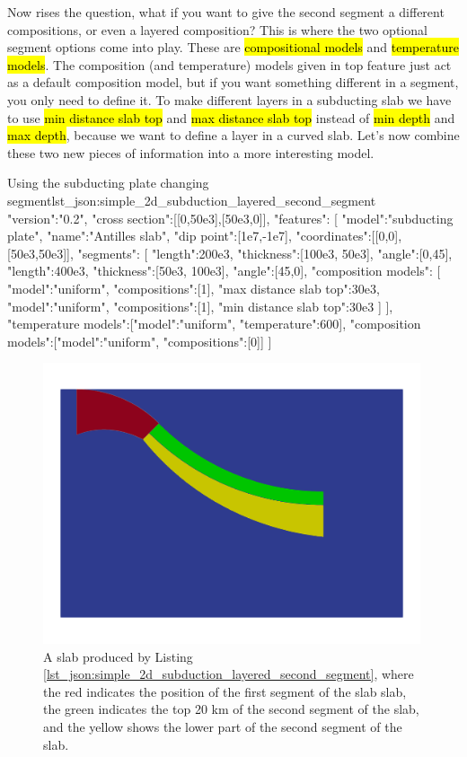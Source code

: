 \documentclass{book}
\begin{document}
Now rises the question, what if you want to give the second segment a different compositions, or even a layered composition? This is where the two optional segment options come into play. These are \hl{compositional models} and \hl{temperature models}. The composition (and temperature) models given in top feature just act as a default composition model, but if you want something different in a segment, you only need to define it. To make different layers in a subducting slab we have to use \hl{min distance slab top} and \hl{max distance slab top} instead of \hl{min depth} and \hl{max depth}, because we want to define a layer in a curved slab. Let's now combine these two new pieces of information into a more interesting model.

\begin{javascriptcode}{Using the subducting plate changing segment}{lst_json:simple_2d_subduction_layered_second_segment}
{
  "version":"0.2",
  "cross section":[[0,50e3],[50e3,0]],
  "features":
  [
     {
       "model":"subducting plate", "name":"Antilles slab", "dip point":[1e7,-1e7],
       "coordinates":[[0,0],[50e3,50e3]], 
       "segments":
       [
         {"length":200e3, "thickness":[100e3, 50e3], "angle":[0,45]},
         {
           "length":400e3, "thickness":[50e3, 100e3], "angle":[45,0],
           "composition models":
           [
             {"model":"uniform", "compositions":[1], "max distance slab top":30e3},
             {"model":"uniform", "compositions":[1], "min distance slab top":30e3}
           ]
         }
       ],
       "temperature models":[{"model":"uniform", "temperature":600}],
       "composition models":[{"model":"uniform", "compositions":[0]}]
    }
  ]
}
\end{javascriptcode}


\begin{figure}
    \centering
    \includegraphics[width=0.99\textwidth]{simple_subducting_plate_example_segments.png}
    \caption{A slab produced by Listing \ref{lst_json:simple_2d_subduction_layered_second_segment}, where the red indicates the position of the first segment of the slab slab, the green indicates the top 20 km of the second segment of the slab, and the yellow shows the lower part of the second segment of the slab.}
    \label{fig:simple_2d_subduction_2}
\end{figure}
\end{document}
